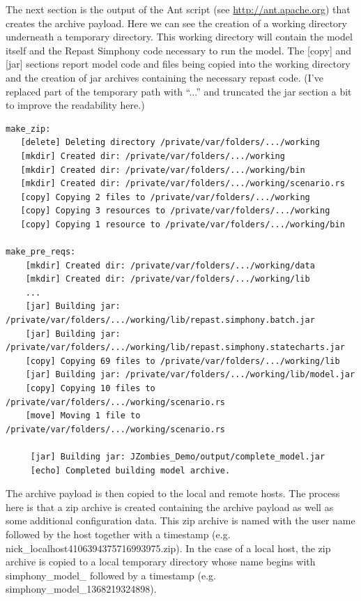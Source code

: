 \documentclass[11pt]{amsart}
\begin{document}
The next section is the output of the Ant script (see \href{http://ant.apache.org}{http://ant.apache.org}) that creates the archive payload. Here we can see the creation of a working directory underneath a temporary directory. This working directory will contain the model itself and the Repast Simphony code necessary to run the model.  The [copy] and [jar] sections report model code and files being copied into the working directory and the creation of jar archives containing the necessary repast code. (I've replaced part of the temporary path with ``...'' and truncated the jar section a bit to improve the readability here.)

\begin{verbatim}
make_zip:
   [delete] Deleting directory /private/var/folders/.../working
   [mkdir] Created dir: /private/var/folders/.../working
   [mkdir] Created dir: /private/var/folders/.../working/bin
   [mkdir] Created dir: /private/var/folders/.../working/scenario.rs
   [copy] Copying 2 files to /private/var/folders/.../working
   [copy] Copying 3 resources to /private/var/folders/.../working
   [copy] Copying 1 resource to /private/var/folders/.../working/bin

make_pre_reqs:
    [mkdir] Created dir: /private/var/folders/.../working/data
    [mkdir] Created dir: /private/var/folders/.../working/lib
    ...
    [jar] Building jar: /private/var/folders/.../working/lib/repast.simphony.batch.jar
    [jar] Building jar: /private/var/folders/.../working/lib/repast.simphony.statecharts.jar
    [copy] Copying 69 files to /private/var/folders/.../working/lib
    [jar] Building jar: /private/var/folders/.../working/lib/model.jar
    [copy] Copying 10 files to /private/var/folders/.../working/scenario.rs
    [move] Moving 1 file to /private/var/folders/.../working/scenario.rs

     [jar] Building jar: JZombies_Demo/output/complete_model.jar
     [echo] Completed building model archive.
\end{verbatim}

The archive payload is then copied to the local and remote hosts. The process here is that a zip archive is created containing the archive payload as well as some additional configuration data. This zip archive is named with the user name followed by the host together with a timestamp (e.g. nick\_localhost4106394375716993975.zip). In the case of a local host, the zip archive is copied to a local temporary directory whose name begins with simphony\_model\_ followed by a timestamp (e.g. simphony\_model\_1368219324898).
\end{document}
